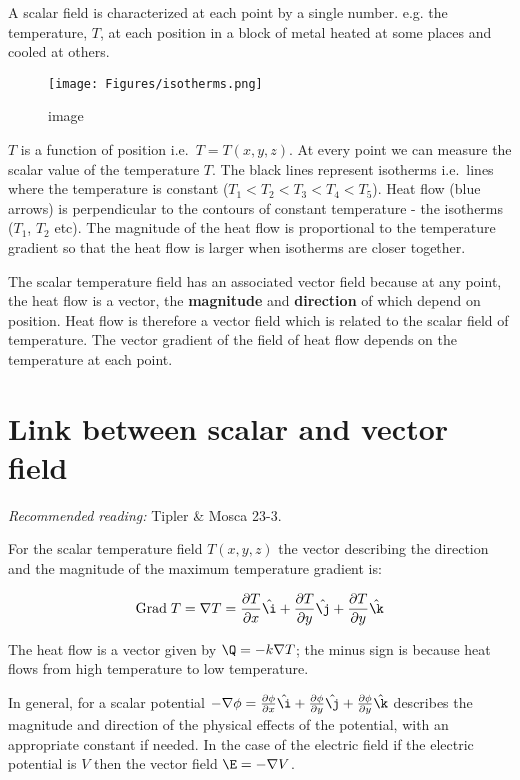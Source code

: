 \documentclass[
]{book}
\theoremstyle{definition}
\theoremstyle{definition}
\theoremstyle{definition}
\theoremstyle{definition}
\theoremstyle{remark}
\begin{document}
A scalar field is characterized at each point by a single number. e.g.
the temperature, \(T\), at each position in a block of metal heated at
some places and cooled at others.

\begin{figure}
\centering
\texttt{[image: Figures/isotherms.png]}
\caption{image}
\end{figure}

\(T\) is a function of position i.e.~\(T = T(x,y,z)\). At every point we can
measure the scalar value of the temperature \(T\). The black lines
represent isotherms i.e.~lines where the temperature is constant
(\(T_1 < T_2 < T_3 < T_4 < T_5\)). Heat flow (blue arrows) is
perpendicular to the contours of constant temperature - the isotherms
(\(T_1\), \(T_2\) etc). The magnitude of the heat flow is proportional to
the temperature gradient so that the heat flow is larger when isotherms
are closer together.

The scalar temperature field has an associated vector field because at
any point, the heat flow is a vector, the \textbf{magnitude} and
\textbf{direction} of which depend on position. Heat flow is therefore a
vector field which is related to the scalar field of temperature. The
vector gradient of the field of heat flow depends on the temperature at
each point.

\hypertarget{link-between-scalar-and-vector-field}{%
\section{Link between scalar and vector field}\label{link-between-scalar-and-vector-field}}

\emph{Recommended reading:} Tipler \& Mosca 23-3.

For the scalar temperature field \(T(x,y,z)\) the vector describing the
direction and the magnitude of the maximum temperature gradient is:

\[\begin{aligned}
 \text{Grad} \; T = \nabla T = \frac{\partial T} {\partial x} \hat{\i} + \frac{\partial T}{\partial y} \hat{\j} + \frac{\partial T}{\partial y} \hat{\k}
\end{aligned}\]

The heat flow is a vector given by \(\Q = -k \nabla T\); the minus sign is
because heat flows from high temperature to low temperature.

In general, for a scalar potential
\(-\nabla \phi = \frac{\partial \phi} {\partial x} \hat{\i} + \frac{\partial \phi}{\partial y} \hat{\j} + \frac{\partial \phi}{\partial y} \hat{\k}\)
describes the magnitude and direction of the physical effects of the
potential, with an appropriate constant if needed. In the case of the
electric field if the electric potential is \(V\) then the vector field
\(\E = -\nabla V\).
\end{document}

